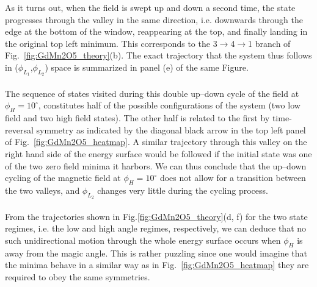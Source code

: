 As it turns out, when the field is swept up and down a second time, the state progresses through the valley in the same direction, i.e. downwards through the edge at the bottom of the window, reappearing at the top, and finally landing in the original top left minimum.
This corresponds to the 3$\rightarrow$4$\rightarrow$1 branch of Fig.~\ref{fig:GdMn2O5_theory}(b).
The exact trajectory that the system thus follows in ($\phi_{L_1}$,$\phi_{L_2}$) space is summarized in panel (e) of the same Figure.
\\\\
The sequence of states visited during this double up--down cycle of the field at $\phi_H = 10^\circ$, constitutes half of the possible configurations of the system (two low field and two high field states).
The other half is related to the first by time-reversal symmetry as indicated by the diagonal black arrow in the top left panel of Fig.~\ref{fig:GdMn2O5_heatmap}.
A similar trajectory through this valley on the right hand side of the energy surface would be followed if the initial state was one of the two zero field minima it harbors. 
We can thus conclude that the up--down cycling of the magnetic field at $\phi_H=10^\circ$ does not allow for a transition between the two valleys, and $\phi_{L_2}$ changes very little during the cycling process.
\\\\
From the trajectories shown in Fig.\ref{fig:GdMn2O5_theory}(d, f) for the two state regimes, i.e. the low and high angle regimes, respectively, we can deduce that no such unidirectional motion through the whole energy surface occurs when $\phi_H$ is away from the magic angle.
This is rather puzzling since one would imagine that the minima behave in a similar way as in Fig.~\ref{fig:GdMn2O5_heatmap} they are required to obey the same symmetries.

